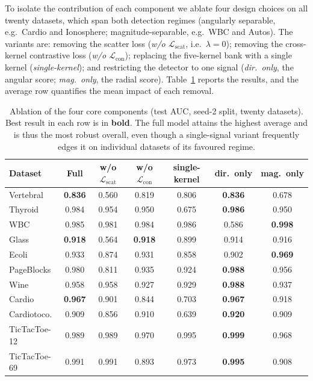 \documentclass[times, review, 10pt]{elsarticle}
\newcommand{\Lcross}{\mathcal{L}_{\mathrm{con}}}
\newcommand{\Lscat}{\mathcal{L}_{\mathrm{scat}}}
\begin{document}
To isolate the contribution of each component we ablate four design choices on
all twenty datasets, which span both detection regimes
(angularly separable, e.g.\ Cardio and Ionosphere; magnitude-separable, e.g.\
WBC and Autos). The variants are: removing the scatter loss
(\emph{w/o $\Lscat$}, i.e.\ $\lambda=0$); removing the cross-kernel contrastive
loss (\emph{w/o $\Lcross$}); replacing the five-kernel bank with a single kernel
(\emph{single-kernel}); and restricting the detector to one signal
(\emph{dir.\ only}, the angular score; \emph{mag.\ only}, the radial score).
Table~\ref{tab:ablation} reports the results, and the average row quantifies the
mean impact of each removal.

\begin{table}[t]
\centering
\caption{Ablation of the four core components (test AUC, seed-2 split, twenty
datasets). Best result in each row is in \textbf{bold}. The full model attains the
highest average and is thus the most robust overall, even though a single-signal
variant frequently edges it on individual datasets of its favoured regime.}
\label{tab:ablation}
\small
\setlength{\tabcolsep}{4.5pt}
\begin{tabular}{lcccccc}
\toprule
Dataset & Full & w/o $\Lscat$ & w/o $\Lcross$ & single-kernel
        & dir.\ only & mag.\ only\\
\midrule
Vertebral    & \textbf{0.836} & 0.560 & 0.819 & 0.806 & \textbf{0.836} & 0.678 \\
Thyroid      & 0.984 & 0.954 & 0.950 & 0.675 & \textbf{0.986} & 0.950 \\
WBC          & 0.985 & 0.981 & 0.984 & 0.986 & 0.586 & \textbf{0.998} \\
Glass        & \textbf{0.918} & 0.564 & \textbf{0.918} & 0.899 & 0.914 & 0.916 \\
Ecoli        & 0.933 & 0.874 & 0.931 & 0.858 & 0.902 & \textbf{0.969} \\
PageBlocks   & 0.980 & 0.811 & 0.935 & 0.924 & \textbf{0.988} & 0.956 \\
Wine         & 0.958 & 0.958 & 0.927 & 0.929 & \textbf{0.988} & 0.937 \\
Cardio       & \textbf{0.967} & 0.901 & 0.844 & 0.703 & \textbf{0.967} & 0.918 \\
Cardiotoco.  & 0.909 & 0.856 & 0.910 & 0.639 & \textbf{0.920} & 0.909 \\
TicTacToe-12 & 0.989 & 0.989 & 0.970 & 0.995 & \textbf{0.999} & 0.968 \\
TicTacToe-69 & 0.991 & 0.991 & 0.893 & 0.973 & \textbf{0.995} & 0.908 \\

\end{tabular}
\end{table}
\end{document}
